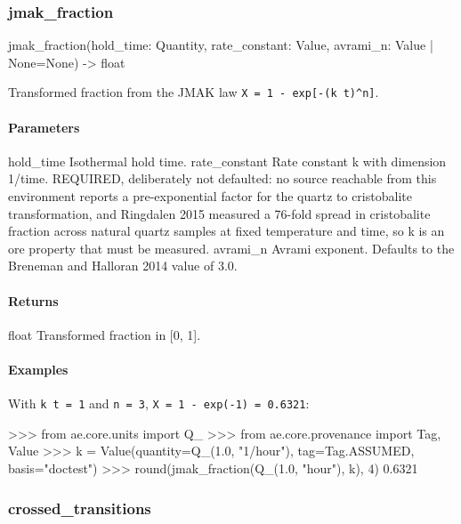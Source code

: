 \documentclass[10pt,a4paper,twoside]{report}
\begin{document}
\subsubsection*{jmak\_fraction}

\begin{verbatimsmall}
jmak_fraction(hold_time: Quantity, rate_constant: Value, avrami_n: Value | None=None) -> float
\end{verbatimsmall}

Transformed fraction from the JMAK law \texttt{X = 1 - exp[-(k t)\textasciicircum{}n]}.

\paragraph*{Parameters}

hold\_time Isothermal hold time. rate\_constant Rate constant k with dimension 1/time. REQUIRED, deliberately not defaulted: no source reachable from this environment reports a pre-exponential factor for the quartz to cristobalite transformation, and Ringdalen 2015 measured a 76-fold spread in cristobalite fraction across natural quartz samples at fixed temperature and time, so k is an ore property that must be measured. avrami\_n Avrami exponent. Defaults to the Breneman and Halloran 2014 value of 3.0.

\paragraph*{Returns}

float Transformed fraction in [0, 1].

\paragraph*{Examples}

With \texttt{k t = 1} and \texttt{n = 3}, \texttt{X = 1 - exp(-1) = 0.6321}:

\begin{doctestblock}
>>> from ae.core.units import Q_
>>> from ae.core.provenance import Tag, Value
>>> k = Value(quantity=Q_(1.0, "1/hour"), tag=Tag.ASSUMED, basis="doctest")
>>> round(jmak_fraction(Q_(1.0, "hour"), k), 4)
0.6321
\end{doctestblock}

\subsubsection*{crossed\_transitions}
\end{document}
